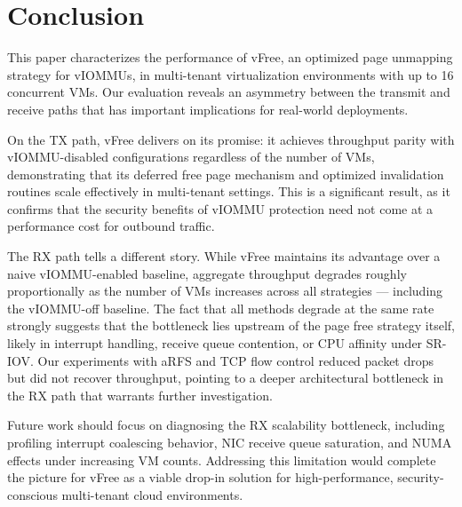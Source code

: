 \section{Conclusion}
\label{sec:conclusion}

This paper characterizes the performance of vFree, an optimized page unmapping strategy for vIOMMUs, in multi-tenant virtualization environments with up to 16 concurrent VMs. Our evaluation reveals an asymmetry between the transmit and receive paths that has important implications for real-world deployments.

On the TX path, vFree delivers on its promise: it achieves throughput parity with vIOMMU-disabled configurations regardless of the number of VMs, demonstrating that its deferred free page mechanism and optimized invalidation routines scale effectively in multi-tenant settings. This is a significant result, as it confirms that the security benefits of vIOMMU protection need not come at a performance cost for outbound traffic.

The RX path tells a different story. While vFree maintains its advantage over a naive vIOMMU-enabled baseline, aggregate throughput degrades roughly proportionally as the number of VMs increases across all strategies — including the vIOMMU-off baseline. The fact that all methods degrade at the same rate strongly suggests that the bottleneck lies upstream of the page free strategy itself, likely in interrupt handling, receive queue contention, or CPU affinity under SR-IOV. Our experiments with aRFS and TCP flow control reduced packet drops but did not recover throughput, pointing to a deeper architectural bottleneck in the RX path that warrants further investigation.

Future work should focus on diagnosing the RX scalability bottleneck, including profiling interrupt coalescing behavior, NIC receive queue saturation, and NUMA effects under increasing VM counts. Addressing this limitation would complete the picture for vFree as a viable drop-in solution for high-performance, security-conscious multi-tenant cloud environments.
